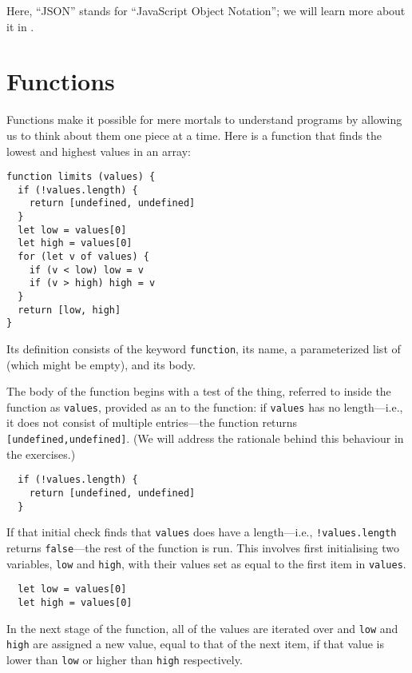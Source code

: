 \noindent
Here,
``JSON'' stands for ``JavaScript Object Notation'';
we will learn more about it in .

\section{Functions}\label{s:basics-functions}

Functions make it possible for mere mortals to understand programs
by allowing us to think about them one piece at a time.
Here is a function that finds the lowest and highest values in an array:

\begin{verbatim}
function limits (values) {
  if (!values.length) {
    return [undefined, undefined]
  }
  let low = values[0]
  let high = values[0]
  for (let v of values) {
    if (v < low) low = v
    if (v > high) high = v
  }
  return [low, high]
}
\end{verbatim}

Its definition consists of the keyword \texttt{function},
its name,
a parameterized list of 
(which might be empty),
and its body.

The body of the function begins with a test of the thing,
referred to inside the function as \texttt{values},
provided as an  to the function:
if \texttt{values} has no length---i.e.,
it does not consist of multiple entries---the function returns \texttt{[undefined,undefined]}.
(We will address the rationale behind this behaviour in the exercises.)

\begin{verbatim}
  if (!values.length) {
    return [undefined, undefined]
  }
\end{verbatim}

\noindent
If that initial check finds that \texttt{values} does have a length---i.e.,
\texttt{!values.length} returns \texttt{false}---the rest of the function is run.
This involves first initialising two variables,
\texttt{low} and \texttt{high},
with their values set as equal to the first item in \texttt{values}.

\begin{verbatim}
  let low = values[0]
  let high = values[0]
\end{verbatim}

In the next stage of the function,
all of the values are iterated over and \texttt{low} and \texttt{high} are
assigned a new value,
equal to that of the next item,
if that value is lower than \texttt{low} or higher than \texttt{high} respectively.

